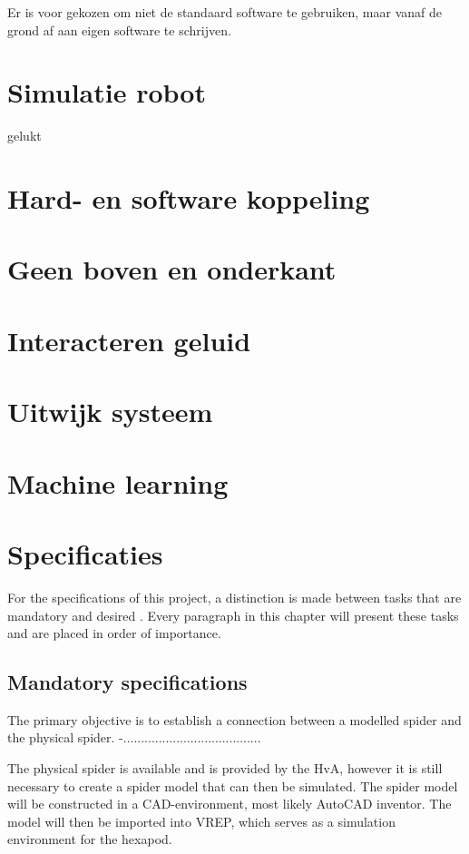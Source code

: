 \documentclass[10pt,a4paper]{article}
\begin{document}
Er is voor gekozen om niet de standaard software te gebruiken, maar vanaf de grond af aan eigen software te schrijven.

\section{Simulatie robot}
gelukt

\section{Hard- en software koppeling}


\section{Geen boven en onderkant}

\section{Interacteren geluid}

\section{Uitwijk systeem}

\section{Machine learning}

\section{Specificaties}

For the specifications of this project, a distinction is made between tasks that are mandatory and desired . Every paragraph in this chapter will present these tasks and are placed in order of importance.

\subsection{Mandatory specifications}
The primary objective is to establish a connection between a modelled spider and the physical spider. 
-.......................................

The physical spider is available and is provided by the HvA, however it is still necessary to create a spider model that can then be simulated. The spider model will be constructed in a CAD-environment, most likely AutoCAD inventor. The model will then be imported into VREP, which serves as a simulation environment for the hexapod.
\end{document}

